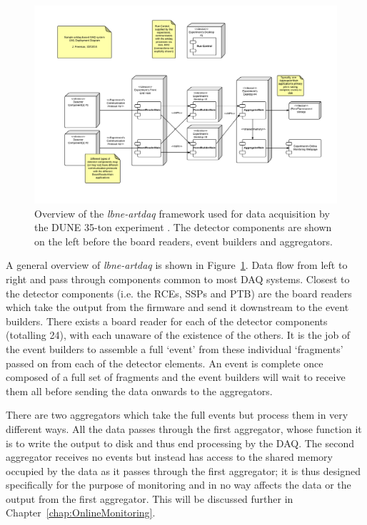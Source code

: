 \begin{figure}
\centering
  \includegraphics[width=16cm]{artdaqFramework.pdf}
  \caption[Overview of the \textit{lbne-artdaq} framework used for data acquisition by the DUNE 35-ton experiment.]{Overview of the \textit{lbne-artdaq} framework used for data acquisition by the DUNE 35-ton experiment \cite{Freeman2014}.  The detector components are shown on the left before the board readers, event builders and aggregators.}
  \label{fig:lbne-artdaq}
\end{figure}

A general overview of \textit{lbne-artdaq} is shown in Figure~\ref{fig:lbne-artdaq}.  Data flow from left to right and pass through components common to most DAQ systems.  Closest to the detector components (i.e. the RCEs, SSPs and PTB) are the board readers which take the output from the firmware and send it downstream to the event builders.  There exists a board reader for each of the detector components (totalling 24), with each unaware of the existence of the others.  It is the job of the event builders to assemble a full `event' from these individual `fragments' passed on from each of the detector elements.  An event is complete once composed of a full set of fragments and the event builders will wait to receive them all before sending the data onwards to the aggregators.

There are two aggregators which take the full events but process them in very different ways.  All the data passes through the first aggregator, whose function it is to write the output to disk and thus end processing by the DAQ.  The second aggregator receives no events but instead has access to the shared memory occupied by the data as it passes through the first aggregator; it is thus designed specifically for the purpose of monitoring and in no way affects the data or the output from the first aggregator.  This will be discussed further in Chapter~\ref{chap:OnlineMonitoring}.

